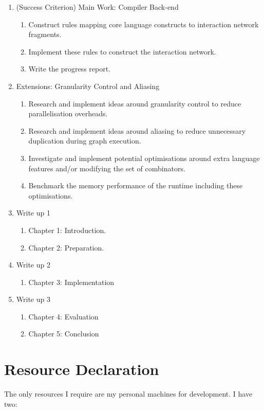 \documentclass{article}
\begin{document}
\begin{enumerate}
\begin{enumerate}
    \end{enumerate}
    \item (Success Criterion) Main Work: Compiler Back-end
    \begin{enumerate}
        \item Construct rules mapping core language constructs to interaction network fragments.
        \item Implement these rules to construct the interaction network.
        \item Write the progress report.
    \end{enumerate}
    \item Extensions: Granularity Control and Aliasing
    \begin{enumerate}
        \item Research and implement ideas around granularity control to reduce parallelisation overheads.
        \item Research and implement ideas around aliasing to reduce unnecessary duplication during graph execution.
        \item Investigate and implement potential optimisations around extra language features and/or modifying the set of combinators.
        \item Benchmark the memory performance of the runtime including these optimisations.
    \end{enumerate}
    \item Write up 1
    \begin{enumerate}
        \item Chapter 1: Introduction.
        \item Chapter 2: Preparation.
    \end{enumerate}
    \item Write up 2
    \begin{enumerate}
        \item Chapter 3: Implementation
    \end{enumerate}
    \item Write up 3
    \begin{enumerate}
        \item Chapter 4: Evaluation
        \item Chapter 5: Conclusion
    \end{enumerate}
\end{enumerate}
 
\section{Resource Declaration}
The only resources I require are my personal machines for development. I have two:
\end{document}
